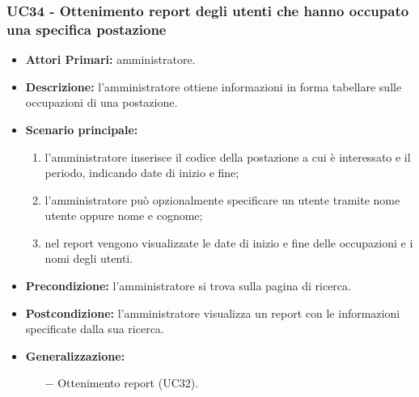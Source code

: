 \subsubsection{ UC34 - Ottenimento report degli utenti che hanno occupato una specifica postazione}
\begin{itemize}
	\item\textbf{Attori Primari:} 
	amministratore.
	\item\textbf{Descrizione:} 
	l'amministratore ottiene informazioni in forma tabellare sulle occupazioni di una postazione.
	\item\textbf{Scenario principale:} 
	\begin{enumerate}
		\item l'amministratore inserisce il codice della postazione a cui è interessato e il periodo, indicando date di inizio e fine;
		\item l'amministratore può opzionalmente specificare un utente tramite nome utente oppure nome e cognome;
		\item nel report vengono visualizzate le date di inizio e fine delle occupazioni e i nomi degli utenti.
	\end{enumerate}
	\item\textbf{Precondizione:} 
	l'amministratore si trova sulla pagina di ricerca.
	\item\textbf{Postcondizione:}
	l'amministratore visualizza un report con le informazioni specificate dalla sua ricerca.
	\item\textbf{Generalizzazione:}
	\begin{itemize}
		\item[$-$] Ottenimento report (UC32).
	\end{itemize}
\end{itemize}


